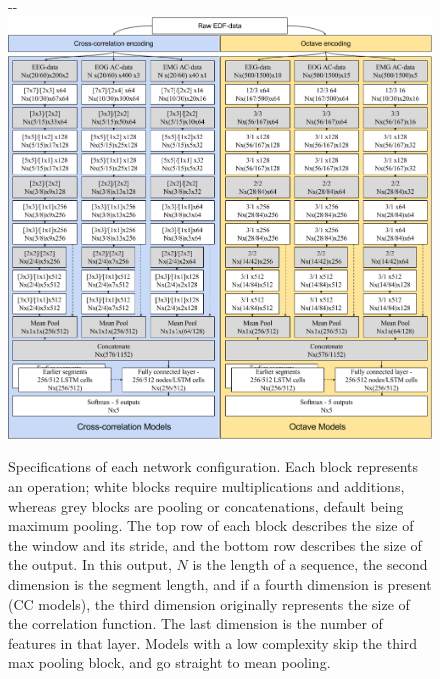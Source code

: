 \begin{figure}
\begin{adjustwidth*}{}{-\marginparwidth-\marginparsep}
    \centering
    \includegraphics[width=\linewidth]{figures/paper-iii/SuppFigure_3.png}
    \caption[Network configurations]{Specifications of each network configuration. Each block represents an operation; white blocks require multiplications and additions, whereas grey blocks are pooling or concatenations, default being maximum pooling. The top row of each block describes the size of the window and its stride, and the bottom row describes the size of the output. In this output, \(N\) is the length of a sequence, the second dimension is the segment length, and if a fourth dimension is present (\acs{CC} models), the third dimension originally represents the size of the correlation function. The last dimension is the number of features in that layer. Models with a low complexity skip the third max pooling block, and go straight to mean pooling.}
    \label{fig:sleep-stages:paper-iii:figure-s03}
\end{adjustwidth*}
\end{figure}

